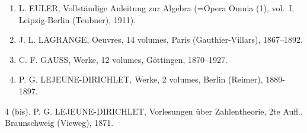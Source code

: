 
\begin{enumerate}
\def\labelenumi{\arabic{enumi}.}
\item
  L. EULER, Vollständige Anleitung zur Algebra (=Opera Omnia (1), vol.~I, Leipzig-Berlin (Teubner), 1911).
\item
  J. L. LAGRANGE, Oeuvres, 14 volumes, Paris (Gauthier-Villars), 1867--1892.
\item
  C. F. GAUSS, Werke, 12 volumes, Göttingen, 1870--1927.
\item
  P. G. LEJEUNE-DIRICHLET, Werke, 2 volumes, Berlin (Reimer), 1889-1897.
\end{enumerate}

4 (bis). P. G. LEJEUNE-DIRICHLET, Vorlesungen über Zahlentheorie, 2te Aufl., Braunschweig (Vieweg), 1871.

